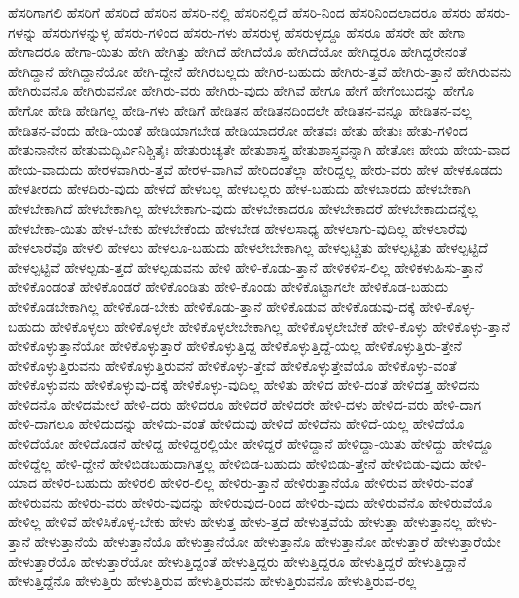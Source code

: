 {ಹೆಸರಿಗಾಗಲಿ
ಹೆಸರಿಗೆ
ಹೆಸರಿದೆ
ಹೆಸರಿನ
ಹೆಸರಿ-ನಲ್ಲಿ
ಹೆಸರಿನಲ್ಲಿದೆ
ಹೆಸರಿ-ನಿಂದ
ಹೆಸರಿನಿಂದಲಾದರೂ
ಹೆಸರು
ಹೆಸರು-ಗಳನ್ನು
ಹೆಸರುಗಳನ್ನುಳ್ಳ
ಹೆಸರು-ಗಳಿಂದ
ಹೆಸರು-ಗಳು
ಹೆಸರುಳ್ಳ
ಹೆಸರುಳ್ಳದ್ದೂ
ಹೆಸರೂ
ಹೆಸರೇ
ಹೇ
ಹೇಗಾ
ಹೇಗಾದರೂ
ಹೇಗಾ-ಯಿತು
ಹೇಗಿ
ಹೇಗಿತ್ತು
ಹೇಗಿದೆ
ಹೇಗಿದೆಯೊ
ಹೇಗಿದೆಯೋ
ಹೇಗಿದ್ದರೂ
ಹೇಗಿದ್ದರೇನಂತೆ
ಹೇಗಿದ್ದಾನೆ
ಹೇಗಿದ್ದಾನೆಯೋ
ಹೇಗಿ-ದ್ದೇನೆ
ಹೇಗಿರಬಲ್ಲದು
ಹೇಗಿರ-ಬಹುದು
ಹೇಗಿರು-ತ್ತವೆ
ಹೇಗಿರು-ತ್ತಾನೆ
ಹೇಗಿರುವನು
ಹೇಗಿರುವನೊ
ಹೇಗಿರುವನೋ
ಹೇಗಿರು-ವರು
ಹೇಗಿರು-ವುದು
ಹೇಗಿವೆ
ಹೇಗೂ
ಹೇಗೆ
ಹೇಗೆಂಬುದನ್ನು
ಹೇಗೊ
ಹೇಗೋ
ಹೇಡಿ
ಹೇಡಿಗಲ್ಲ
ಹೇಡಿ-ಗಳು
ಹೇಡಿಗೆ
ಹೇಡಿತನ
ಹೇಡಿತನದಿಂದಲೇ
ಹೇಡಿತನ-ವನ್ನೂ
ಹೇಡಿತನ-ವಲ್ಲ
ಹೇಡಿತನ-ವೆಂದು
ಹೇಡಿ-ಯಂತೆ
ಹೇಡಿಯಾಗಬೇಡ
ಹೇಡಿಯಾದರೋ
ಹೇತವಃ
ಹೇತು
ಹೇತುಃ
ಹೇತು-ಗಳಿಂದ
ಹೇತುನಾನೇನ
ಹೇತುಮದ್ಭಿರ್ವಿನಿಶ್ಚಿತೈಃ
ಹೇತುರುಚ್ಯತೇ
ಹೇತುಶಾಸ್ತ್ರ
ಹೇತುಶಾಸ್ತ್ರವನ್ನಾಗಿ
ಹೇತೋಃ
ಹೇಯ
ಹೇಯ-ವಾದ
ಹೇಯ-ವಾದುದು
ಹೇರಳವಾಗಿರು-ತ್ತವೆ
ಹೇರಳ-ವಾಗಿವೆ
ಹೇರಿದಂತೆಲ್ಲಾ
ಹೇರಿದ್ದಲ್ಲ
ಹೇರು-ವರು
ಹೇಳ
ಹೇಳಕೂಡದು
ಹೇಳತೀರದು
ಹೇಳದಿರು-ವುದು
ಹೇಳದೆ
ಹೇಳಬಲ್ಲ
ಹೇಳಬಲ್ಲರು
ಹೇಳ-ಬಹುದು
ಹೇಳಬಾರದು
ಹೇಳಬೇಕಾಗಿ
ಹೇಳಬೇಕಾಗಿದೆ
ಹೇಳಬೇಕಾಗಿಲ್ಲ
ಹೇಳಬೇಕಾಗು-ವುದು
ಹೇಳಬೇಕಾದರೂ
ಹೇಳಬೇಕಾದರೆ
ಹೇಳಬೇಕಾದುದನ್ನೆಲ್ಲ
ಹೇಳಬೇಕಾ-ಯಿತು
ಹೇಳ-ಬೇಕು
ಹೇಳಬೇಕೆಂದು
ಹೇಳಬೇಡ
ಹೇಳಲಸಾಧ್ಯ
ಹೇಳಲಾಗು-ವುದಿಲ್ಲ
ಹೇಳಲಾರೆವು
ಹೇಳಲಾರೆವೊ
ಹೇಳಲಿ
ಹೇಳಲು
ಹೇಳಲೂ-ಬಹುದು
ಹೇಳಲೇಬೇಕಾಗಿಲ್ಲ
ಹೇಳಲ್ಪಟ್ಚಿತು
ಹೇಳಲ್ಪಟ್ಟಿತು
ಹೇಳಲ್ಪಟ್ಟಿದೆ
ಹೇಳಲ್ಪಟ್ಟಿವೆ
ಹೇಳಲ್ಪಡು-ತ್ತದೆ
ಹೇಳಲ್ಪಡುವನು
ಹೇಳಿ
ಹೇಳಿ-ಕೊಡು-ತ್ತಾನೆ
ಹೇಳಿಕಳಿಸ-ಲಿಲ್ಲ
ಹೇಳಿಕಳುಹಿಸು-ತ್ತಾನೆ
ಹೇಳಿಕೊಂಡಂತೆ
ಹೇಳಿಕೊಂಡರೆ
ಹೇಳಿಕೊಂಡಿತು
ಹೇಳಿ-ಕೊಂಡು
ಹೇಳಿಕೊಟ್ಟಾಗಲೇ
ಹೇಳಿಕೊಡ-ಬಹುದು
ಹೇಳಿಕೊಡಬೇಕಾಗಿಲ್ಲ
ಹೇಳಿಕೊಡ-ಬೇಕು
ಹೇಳಿಕೊಡು-ತ್ತಾನೆ
ಹೇಳಿಕೊಡುವ
ಹೇಳಿಕೊಡುವು-ದಕ್ಕೆ
ಹೇಳಿ-ಕೊಳ್ಳ-ಬಹುದು
ಹೇಳಿಕೊಳ್ಳಲು
ಹೇಳಿಕೊಳ್ಳಲೇ
ಹೇಳಿಕೊಳ್ಳಲೇಬೇಕಾಗಿಲ್ಲ
ಹೇಳಿಕೊಳ್ಳಲೇಬೇಕೆ
ಹೇಳಿ-ಕೊಳ್ಳು
ಹೇಳಿಕೊಳ್ಳು-ತ್ತಾನೆ
ಹೇಳಿಕೊಳ್ಳುತ್ತಾನೆಯೋ
ಹೇಳಿಕೊಳ್ಳುತ್ತಾರೆ
ಹೇಳಿಕೊಳ್ಳುತ್ತಿದ್ದ
ಹೇಳಿಕೊಳ್ಳುತ್ತಿದ್ದೆ-ಯಲ್ಲ
ಹೇಳಿಕೊಳ್ಳುತ್ತಿರು-ತ್ತೇನೆ
ಹೇಳಿಕೊಳ್ಳುತ್ತಿರುವನು
ಹೇಳಿಕೊಳ್ಳುತ್ತಿರುವನೆ
ಹೇಳಿಕೊಳ್ಳು-ತ್ತೇವೆ
ಹೇಳಿಕೊಳ್ಳುತ್ತೇವೆಯೊ
ಹೇಳಿಕೊಳ್ಳು-ವಂತೆ
ಹೇಳಿಕೊಳ್ಳುವನು
ಹೇಳಿಕೊಳ್ಳುವು-ದಕ್ಕೆ
ಹೇಳಿಕೊಳ್ಳು-ವುದಿಲ್ಲ
ಹೇಳಿತು
ಹೇಳಿದ
ಹೇಳಿ-ದಂತೆ
ಹೇಳಿದತ್ತ
ಹೇಳಿದನು
ಹೇಳಿದನೊ
ಹೇಳಿದಮೇಲೆ
ಹೇಳಿ-ದರು
ಹೇಳಿದರೂ
ಹೇಳಿದರೆ
ಹೇಳಿದರೇ
ಹೇಳಿ-ದಳು
ಹೇಳಿದ-ವರು
ಹೇಳಿ-ದಾಗ
ಹೇಳಿ-ದಾಗಲೂ
ಹೇಳಿದುದನ್ನು
ಹೇಳಿದು-ವಂತೆ
ಹೇಳಿದುವು
ಹೇಳಿದೆ
ಹೇಳಿದೆನು
ಹೇಳಿದೆ-ಯಲ್ಲ
ಹೇಳಿದೆಯೊ
ಹೇಳಿದೆಯೋ
ಹೇಳಿದೊಡನೆ
ಹೇಳಿದ್ದ
ಹೇಳಿದ್ದರಲ್ಲಿಯೇ
ಹೇಳಿದ್ದರೆ
ಹೇಳಿದ್ದಾನೆ
ಹೇಳಿದ್ದಾ-ಯಿತು
ಹೇಳಿದ್ದು
ಹೇಳಿದ್ದೂ
ಹೇಳಿದ್ದೆಲ್ಲ
ಹೇಳಿ-ದ್ದೇನೆ
ಹೇಳಿಬಿಡಬಹುದಾಗಿತ್ತಲ್ಲ
ಹೇಳಿಬಿಡ-ಬಹುದು
ಹೇಳಿಬಿಡು-ತ್ತೇನೆ
ಹೇಳಿಬಿಡು-ವುದು
ಹೇಳಿ-ಯಾದ
ಹೇಳಿರ-ಬಹುದು
ಹೇಳಿರಲಿ
ಹೇಳಿರ-ಲಿಲ್ಲ
ಹೇಳಿರು-ತ್ತಾನೆ
ಹೇಳಿರುತ್ತಾನೆಯೊ
ಹೇಳಿರುವ
ಹೇಳಿರು-ವಂತೆ
ಹೇಳಿರುವನು
ಹೇಳಿರು-ವರು
ಹೇಳಿರು-ವುದನ್ನು
ಹೇಳಿರುವುದ-ರಿಂದ
ಹೇಳಿರು-ವುದು
ಹೇಳಿರುವೆನೊ
ಹೇಳಿರುವೆಯೊ
ಹೇಳಿಲ್ಲ
ಹೇಳಿವೆ
ಹೇಳಿಸಿಕೊಳ್ಳ-ಬೇಕು
ಹೇಳು
ಹೇಳುತ್ತ
ಹೇಳು-ತ್ತದೆ
ಹೇಳುತ್ತವೆಯೆ
ಹೇಳುತ್ತಾ
ಹೇಳುತ್ತಾನಲ್ಲ
ಹೇಳು-ತ್ತಾನೆ
ಹೇಳುತ್ತಾನೆಯೆ
ಹೇಳುತ್ತಾನೆಯೊ
ಹೇಳುತ್ತಾನೆಯೋ
ಹೇಳುತ್ತಾನೊ
ಹೇಳುತ್ತಾನೋ
ಹೇಳುತ್ತಾರೆ
ಹೇಳುತ್ತಾರೆಯೇ
ಹೇಳುತ್ತಾರೆಯೊ
ಹೇಳುತ್ತಾರೆಯೋ
ಹೇಳುತ್ತಿದ್ದಂತೆ
ಹೇಳುತ್ತಿದ್ದರು
ಹೇಳುತ್ತಿದ್ದರೂ
ಹೇಳುತ್ತಿದ್ದರೆ
ಹೇಳುತ್ತಿದ್ದಾನೆ
ಹೇಳುತ್ತಿದ್ದೆನೊ
ಹೇಳುತ್ತಿರು
ಹೇಳುತ್ತಿರುವ
ಹೇಳುತ್ತಿರುವನು
ಹೇಳುತ್ತಿರುವನೊ
ಹೇಳುತ್ತಿರುವ-ರಲ್ಲ
}
